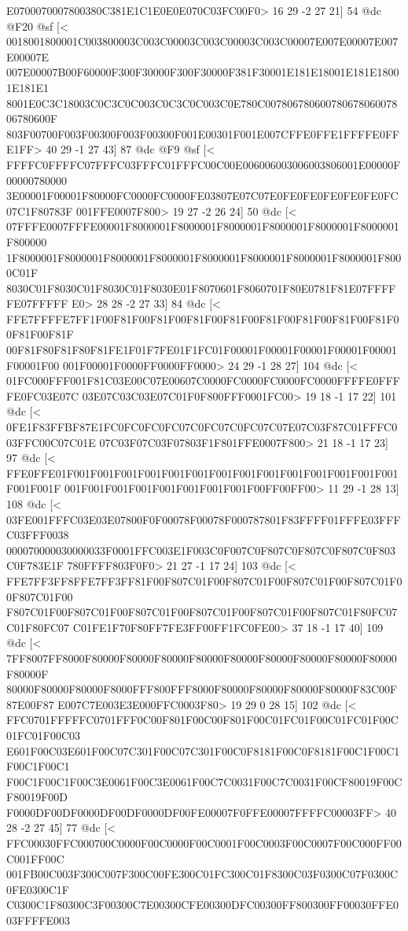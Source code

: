 {E0700070007800380C381E1C1E0E0E070C03FC00F0>
	 16 29 -2 27 21] 54 @dc
@F20 @sf
[<
0018001800001C003800003C003C00003C003C00003C003C00007E007E00007E007E00007E
007E00007B00F60000F300F30000F300F30000F381F30001E181E18001E181E18001E181E1
8001E0C3C18003C0C3C0C003C0C3C0C003C0E780C00780678060078067806007806780600F
803F00700F003F00300F003F00300F001E00301F001E007CFFE0FFE1FFFFE0FFE1FF>
	 40 29 -1 27 43] 87 @dc
@F9 @sf
[<
FFFFC0FFFFC07FFFC03FFFC01FFFC00C00E006006003006003806001E00000F00000780000
3E00001F00001F80000FC0000FC0000FE03807E07C07E0FE0FE0FE0FE0FE0FC07C1F80783F
001FFE0007F800>
	 19 27 -2 26 24] 50 @dc
[<
07FFFE0007FFFE00001F8000001F8000001F8000001F8000001F8000001F8000001F800000
1F8000001F8000001F8000001F8000001F8000001F8000001F8000001F8000001F8000C01F
8030C01F8030C01F8030C01F8030E01F8070601F8060701F80E0781F81E07FFFFFE07FFFFF
E0>
	 28 28 -2 27 33] 84 @dc
[<
FFE7FFFFE7FF1F00F81F00F81F00F81F00F81F00F81F00F81F00F81F00F81F00F81F00F81F
00F81F80F81F80F81FE1F01F7FE01F1FC01F00001F00001F00001F00001F00001F00001F00
001F00001F0000FF0000FF0000>
	 24 29 -1 28 27] 104 @dc
[<
01FC000FFF001F81C03E00C07E00607C0000FC0000FC0000FC0000FFFFE0FFFFE0FC03E07C
03E07C03C03E07C01F0F800FFF0001FC00>
	 19 18 -1 17 22] 101 @dc
[<
0FE1F83FFBF87E1FC0FC0FC0FC07C0FC07C0FC07C07E07C03F87C01FFFC003FFC00C07C01E
07C03F07C03F07803F1F801FFE0007F800>
	 21 18 -1 17 23] 97 @dc
[<
FFE0FFE01F001F001F001F001F001F001F001F001F001F001F001F001F001F001F001F001F
001F001F001F001F001F001F001F001F00FF00FF00>
	 11 29 -1 28 13] 108 @dc
[<
03FE001FFFC03E03E07800F0F00078F00078F000787801F83FFFF01FFFE03FFFC03FFF0038
000070000030000033F0001FFC003E1F003C0F007C0F807C0F807C0F807C0F803C0F783E1F
780FFFF803F0F0>
	 21 27 -1 17 24] 103 @dc
[<
FFE7FF3FF8FFE7FF3FF81F00F807C01F00F807C01F00F807C01F00F807C01F00F807C01F00
F807C01F00F807C01F00F807C01F00F807C01F00F807C01F00F807C01F80FC07C01F80FC07
C01FE1F70F80FF7FE3FF00FF1FC0FE00>
	 37 18 -1 17 40] 109 @dc
[<
7FF8007FF8000F80000F80000F80000F80000F80000F80000F80000F80000F80000F80000F
80000F80000F80000F8000FFF800FFF8000F80000F80000F80000F80000F83C00F87E00F87
E007C7E003E3E000FFC0003F80>
	 19 29 0 28 15] 102 @dc
[<
FFC0701FFFFFC0701FFF0C00F801F00C00F801F00C01FC01F00C01FC01F00C01FC01F00C03
E601F00C03E601F00C07C301F00C07C301F00C0F8181F00C0F8181F00C1F00C1F00C1F00C1
F00C1F00C1F00C3E0061F00C3E0061F00C7C0031F00C7C0031F00CF80019F00CF80019F00D
F0000DF00DF0000DF00DF0000DF00FE00007F0FFE00007FFFFC00003FF>
	 40 28 -2 27 45] 77 @dc
[<
FFC00030FFC000700C0000F00C0000F00C0001F00C0003F00C0007F00C000FF00C001FF00C
001FB00C003F300C007F300C00FE300C01FC300C01F8300C03F0300C07F0300C0FE0300C1F
C0300C1F80300C3F00300C7E00300CFE00300DFC00300FF800300FF00030FFE003FFFFE003
}
